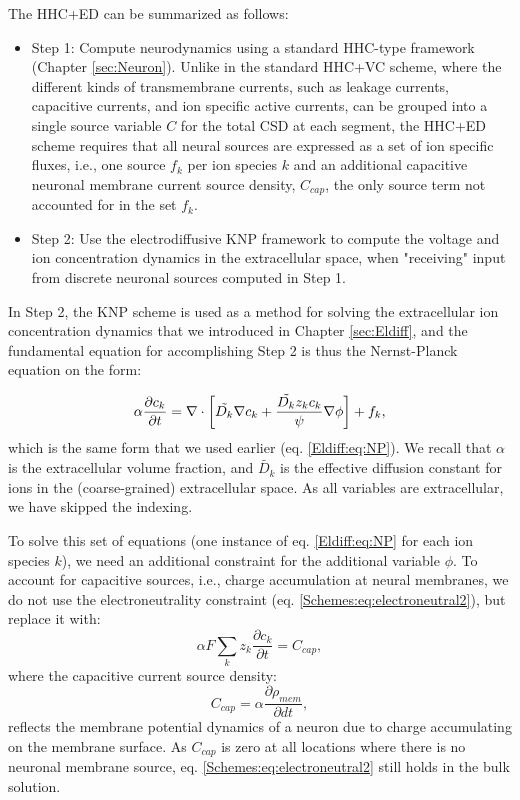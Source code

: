 The HHC+ED can be summarized as follows:

\begin{itemize}
\item Step 1: Compute neurodynamics using a standard HHC-type framework (Chapter \ref{sec:Neuron}). Unlike in the standard HHC+VC scheme, where the different kinds of transmembrane currents, such as leakage currents, capacitive currents, and ion specific active currents, can be grouped into a single source variable $C$ for the total CSD at each segment, the HHC+ED scheme requires that all neural sources are expressed as a set of ion specific fluxes, i.e., one source $f_k$ per ion species $k$ and an additional capacitive neuronal membrane current source density, $C_{cap}$, the only source term not accounted for in the set $f_k$.

\item Step 2: Use the electrodiffusive KNP framework to compute the voltage and ion concentration dynamics in the extracellular space, when "receiving" input from discrete neuronal sources computed in Step 1.

\end{itemize}

In Step 2, the KNP scheme is used as a method for solving the extracellular ion concentration dynamics that we introduced in Chapter \ref{sec:Eldiff}, and the fundamental equation for accomplishing Step 2 is thus the Nernst-Planck equation on the form:

\begin{equation}
\alpha \frac{\partial c_k}{\partial t} = {\bf \nabla} \cdot \left[ \tilde{D_k} {\bf \nabla} c_k + \frac{\tilde{D_k} z_k c_k}{\psi} {\bf \nabla} \phi \right] + f_k,
\label{Schemes:eq:NP}
\end{equation}
which is the same form that we used earlier (eq. \ref{Eldiff:eq:NP}). We recall that $\alpha$ is the extracellular volume fraction, and $\tilde{D_k}$ is the effective diffusion constant for ions in the (coarse-grained) extracellular space. As all variables are extracellular, we have skipped the indexing. 

To solve this set of equations (one instance of eq. \ref{Eldiff:eq:NP} for each ion species $k$), we need an additional constraint for the additional variable $\phi$. To account for capacitive sources, i.e., charge accumulation at neural membranes, we do not use the electroneutrality constraint (eq. \ref{Schemes:eq:electroneutral2}), but replace it with:
\begin{equation}
\alpha F \sum_k{z_k \frac{\partial c_k}{\partial t}} = C_{cap},
\label{Schemes:eq:electroneutral3}
\end{equation}
where the capacitive current source density:
\begin{equation}
C_{cap} = {\alpha}\frac{\partial \rho_{mem}}{\partial dt},
\label{Schemes:eq:Andreas}
\end{equation}
reflects the membrane potential dynamics of a neuron due to charge accumulating on the membrane surface. As $C_{cap}$ is zero at all locations where there is no neuronal membrane source, eq. \ref{Schemes:eq:electroneutral2} still holds in the bulk solution.

